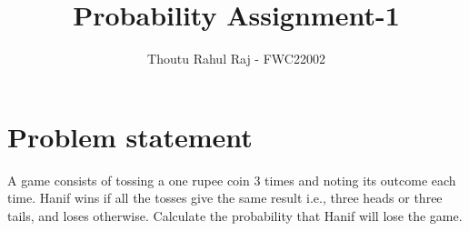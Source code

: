 \documentclass{article}
\begin{document}
\newcommand{\BEQA}{\begin{eqnarray}}
\newcommand{\EEQA}{\end{eqnarray}}
\newcommand{\define}{\stackrel{\triangle}{=}}
\raggedbottom
\setlength{\parindent}{0pt}
\providecommand{\mbf}{\mathbf}
\providecommand{\pr}[1]{\ensuremath{\Pr\left(#1\right)}}
\providecommand{\qfunc}[1]{\ensuremath{Q\left(#1\right)}}
\providecommand{\sbrak}[1]{\ensuremath{{}\left[#1\right]}}
\providecommand{\lsbrak}[1]{\ensuremath{{}\left[#1\right.}}
\providecommand{\rsbrak}[1]{\ensuremath{{}\left.#1\right]}}
\providecommand{\brak}[1]{\ensuremath{\left(#1\right)}}
\providecommand{\lbrak}[1]{\ensuremath{\left(#1\right.}}
\providecommand{\rbrak}[1]{\ensuremath{\left.#1\right)}}
\providecommand{\cbrak}[1]{\ensuremath{\left\{#1\right\}}}
\providecommand{\lcbrak}[1]{\ensuremath{\left\{#1\right.}}
\providecommand{\rcbrak}[1]{\ensuremath{\left.#1\right\}}}
\theoremstyle{remark}
\title{Probability Assignment-1}
\author{\Large Thoutu Rahul Raj - FWC22002}
\date{}
\maketitle
\setcounter{enumi}{3}
\setcounter{enumii}{6}
\section*{\large Problem statement}
A game consists of tossing a one rupee coin 3 times and noting its outcome each time. Hanif wins if all the tosses give the same result i.e., three heads or three tails, and loses otherwise. Calculate the probability that Hanif will lose the game.\\
\end{document}
